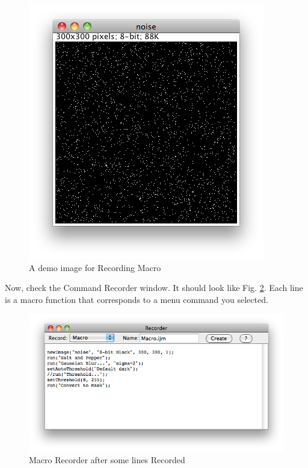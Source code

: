 \begin{figure}[htbp]
\begin{center}
\includegraphics[scale=0.6]{fig/SaltandPepper300.png}
\caption{A demo image for Recording Macro} 
\label{fig_SaltAndPepper}
\end{center}
\end{figure}

Now, check the Command Recorder window. 
It should look like Fig. \ref{fig_macroRecorderFilled}. 
Each line is a macro function that corresponds to a menu command you selected.

\begin{figure}[htbp]
\begin{center}
\includegraphics[scale=0.6]{fig/MacroRecorderFilled.png}
\caption{Macro Recorder after some lines Recorded} 
\label{fig_macroRecorderFilled}
\end{center}
\end{figure}

